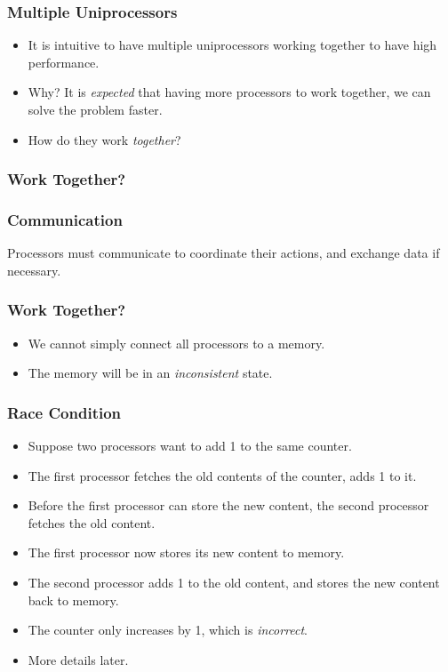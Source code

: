 \documentclass{beamer}
\begin{document}
\begin{CJK}{UTF8}{bsmi}
\begin{frame}
\frametitle{Multiple Uniprocessors}
\begin{itemize}
\item It is intuitive to have multiple uniprocessors working together
  to have high performance.
\item Why? It is {\em expected} that having more processors to work
  together, we can solve the problem faster.
\item How do they work {\em together}?
\end{itemize}
\end{frame}

\begin{frame}
\frametitle{Work Together?}
\centerline{}
\end{frame}

\begin{frame}
\frametitle{Communication} 
\huge Processors must communicate to
coordinate their actions, and exchange data if necessary.
\end{frame}


\begin{frame}
\frametitle{Work Together?}
\centerline{}
\begin{itemize}
\item We cannot simply connect all processors to a memory.
\item The memory will be in an {\em inconsistent} state.
\end{itemize}
\end{frame}

\begin{frame}
\frametitle{Race Condition}
\begin{itemize}
\item Suppose two processors want to add 1 to the same counter.
\item The first processor fetches the old contents of the counter, adds
  1 to it.
\item Before the first processor can store the new content, the
  second processor fetches the old content.
\item The first processor now stores its new content to memory.
\item The second processor adds 1 to the old content, and stores the
  new content back to memory.
\item The counter only increases by 1, which is {\em incorrect}.
\item More details later.
\end{itemize}
\end{frame}



\end{CJK}
\end{document}
